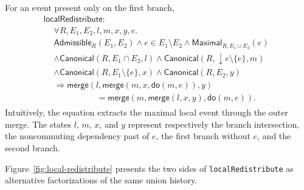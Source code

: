\documentclass[11pt]{article}
\theoremstyle{definition}
\newcommand{\doop}{\mathsf{do}}
\newcommand{\merge}{\mathsf{merge}}
\newcommand{\Can}{\mathsf{Canonical}}
\newcommand{\lean}[1]{\texttt{#1}}
\begin{document}
For an event present only on the first branch,
\[
\begin{gathered}
 \mathsf{localRedistribute}:\\[-0.3em]
\begin{aligned}
 &\forall R,E_1,E_2,l,m,x,y,e.\\
 &\mathsf{Admissible}_R(E_1,E_2)
   \land e\in E_1\setminus E_2
   \land\mathsf{Maximal}_{R,E_1\cup E_2}(e)\\
 &\land\Can(R,E_1\cap E_2,l)
   \land\Can(R,\downarrow e\setminus\{e\},m)\\
 &\land\Can(R,E_1\setminus\{e\},x)
   \land\Can(R,E_2,y)\\
 &\Longrightarrow
 \merge(l,\merge(m,x,\doop(m,e)),y)\\
 &\hspace{5em}=
 \merge(m,\merge(l,x,y),\doop(m,e)).
\end{aligned}
\end{gathered}
\]
Intuitively, the equation extracts the maximal local event through the outer
merge.  The states $l$, $m$, $x$, and $y$ represent respectively the
branch intersection, the noncommuting dependency past of $e$, the first
branch without $e$, and the second branch.

Figure~\ref{fig:local-redistribute} presents the two sides of
\lean{localRedistribute} as alternative factorizations of the same union
history.
\end{document}
